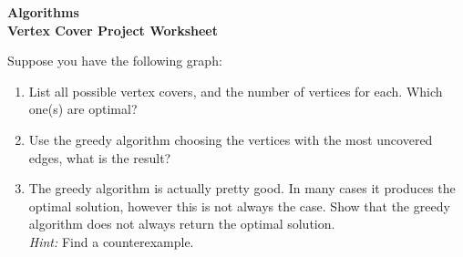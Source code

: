 \documentclass{article}
\begin{document}
\begin{center}
    \large\textbf{Algorithms}\\
    \Large\textbf{Vertex Cover Project Worksheet}
\end{center}

Suppose you have the following graph:
\\
\begin{center}
    

\end{center}
\begin{enumerate}
    \item List all possible vertex covers, and the number of vertices for each. Which one(s) are optimal?
    \newline \newline \newline \newline \newline 
    \newline \newline \newline \newline \newline
    \newline \newline \newline \newline \newline
    \item Use the greedy algorithm choosing the vertices with the most uncovered edges, what is the result?
    \newline \newline \newline \newline \newline
    \newline \newline \newline \newline \newline
    \item The greedy algorithm is actually pretty good. In many cases it produces the optimal solution, however this is not always the case. Show that the greedy algorithm does not always return the optimal solution.\\ \textit{Hint:} Find a counterexample.
\end{enumerate}
\end{document}
